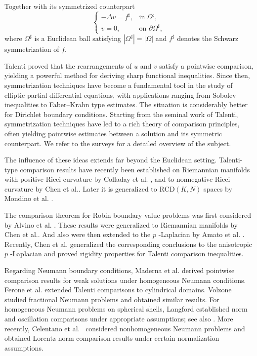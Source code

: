 \documentclass[11pt]{article}
\numberwithin{equation}{section}
\theoremstyle{definition}
\theoremstyle{remark}
\begin{document}
Together with its symmetrized counterpart
\begin{equation}
\begin{cases}
-\Delta v=f^\sharp,
& \text{in }\Omega^\sharp,
\\
v=0,
& \text{on }\partial\Omega^\sharp,
\end{cases}
\end{equation}
where $\Omega^\sharp$ is a Euclidean ball satisfying
$|\Omega^\sharp|=|\Omega|$ and $f^\sharp$ denotes the Schwarz symmetrization of $f$.

Talenti proved that the rearrangements of $u$ and $v$ satisfy a pointwise comparison, yielding a powerful method for deriving sharp functional inequalities. 
Since then, symmetrization techniques have become a fundamental tool in the study of elliptic partial differential equations, 
with applications ranging from Sobolev inequalities to Faber--Krahn type estimates.
The situation is considerably better for Dirichlet boundary conditions.
Starting from the seminal work of Talenti, symmetrization techniques
have led to a rich theory of comparison principles, often yielding
pointwise estimates between a solution and its symmetric counterpart.
We refer to the surveys
\cite{kawohl2006rearrangements,kesavan2006symmetrization}
for a detailed overview of the subject.

The influence of these ideas extends far beyond the Euclidean setting.
Talenti-type comparison results have recently been established on
Riemannian manifolds with positive Ricci curvature by Colladay et al.
\cite{colladay2018comparison}, and to nonnegative Ricci curvature by Chen et al.\cite{chen2021talenti}.
Later it is generalized to
$\mathrm{RCD}(K,N)$ spaces by Mondino et al.
\cite{mondino2021talenti}.

The comparison theorem for Robin boundary value problems was first considered by Alvino et al. \cite{alvino2023talenti}. 
These results were generalized to Riemannian manifolds by Chen et al.\cite{chen2023comparison}. 
And also were then extended to the 
$p$
-Laplacian by Amato et al. \cite{amato2022comparison}. 
Recently, Chen et al. \cite{chen2025talenti} generalized the corresponding conclusions to the anisotropic 
$p$
-Laplacian and proved rigidity properties for Talenti comparison inequalities.

Regarding Neumann boundary conditions, Maderna et al. \cite{maderna1979symmetrization} derived pointwise comparison results for weak solutions 
 under homogeneous Neumann conditions.
Ferone et al. \cite{ferone2005neumann} extended Talenti comparisons to cylindrical domains.
 Volzone \cite{volzone2016symmetrization} studied fractional Neumann problems and obtained similar results. 
For homogeneous Neumann problems on spherical shells, 
Langford \cite{langford2015symmetrization} established norm and oscillation comparisons under appropriate assumptions; 
see also \cite{langford2015neumann}.
More recently, Celentano et al.~\cite{celentano2025talenti}
considered nonhomogeneous Neumann problems and
obtained Lorentz norm comparison results under certain normalization assumptions.
\end{document}
